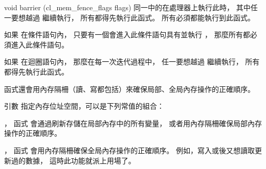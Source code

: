 void barrier (cl_mem_fence_flags flags) 
\stopbuffer
{}
同一中的在處理器上執行此時，
其中任一要想越過  繼續執行，
所有都得先執行此函式。
所有必須都能執行到此函式。

如果  在條件語句內，
只要有一個會進入此條件語句具有並執行 ，
那麼所有都必須進入此條件語句。

如果  在迴圈語句內，
那麼在每一次迭代過程中，
任一要想越過  繼續執行，
所有都得先執行此函式。

 函式還會用內存隔柵（讀、寫都包括）來確保局部、全局內存操作的正確順序。

引數  指定內存位址空間，可以是下列常值的組合：
\startigBase
\item {}，
函式  會通過刷新存儲在局部內存中的所有變量，
或者用內存隔柵確保局部內存操作的正確順序。

\item {}，
函式  會用內存隔柵確保全局內存操作的正確順序。
例如，寫入或後又想讀取更新過的數據，
這時此功能就派上用場了。
\stopigBase
\stopbuffer

\startCLFD


\stopCLFD

